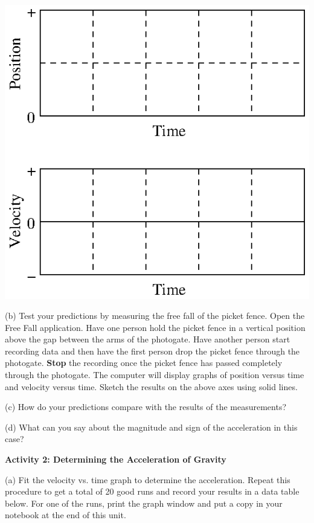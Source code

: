 \vspace{0.3cm}
{\par\centering \includegraphics{acceleration/acceleration_fig1.eps} \par}
\vspace{0.3cm}

(b) Test your predictions by measuring the free fall of the picket fence. Open
the Free Fall application. Have one person hold the picket fence in a vertical
position above the gap between the arms of the photogate. Have another person
start recording data and then have the first person drop the picket fence through
the photogate. \textbf{Stop} the recording once the picket fence has passed
completely through the photogate. The computer will display graphs of position
versus time and velocity versus time. Sketch the results on the above axes using
solid lines.

(c) How do your predictions compare with the results of the measurements?
\vspace{20mm}

(d) What can you say about the magnitude and sign of the acceleration in this
case?
\vspace{20mm}

\textbf{Activity 2: Determining the Acceleration of Gravity }

(a) Fit the velocity vs. time graph to determine the acceleration. Repeat this
procedure to get a total of 20 good runs and record your results in a data table
below. For one of the runs, print the graph window and put a copy in your notebook
at the end of this unit.
\vspace{50mm}

